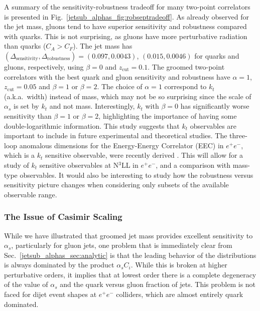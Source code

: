 \documentclass[11pt]{cernrep}
\begin{document}
A summary of the sensitivity-robustness tradeoff for many two-point correlators is presented in Fig.~\ref{jetsub_alphas_fig:robseptradeoff}.  As already observed for the jet mass, gluons tend to have superior sensitivity and robustness compared with quarks.
%
This is not surprising, as gluons have more perturbative radiation than quarks ($C_A>C_F$).
%
The jet mass has $(\Delta_\mathrm{sensitivity},\Delta_\mathrm{robustness})=(0.097,0.0043)$, $(0.015,0.0046)$ for quarks and gluons, respectively, using $\beta=0$ and $z_\mathrm{cut}=0.1$.
%
The groomed two-point correlators with the best quark and gluon sensitivity and robustness have $\alpha=1$, $z_\mathrm{cut}=0.05$ and $\beta=1$ or $\beta=2$.
%
The choice of $\alpha=1$ correspond to $k_t$ (a.k.a.~width) instead of mass, which may not be so surprising since the scale of $\alpha_s$ is set by $k_t$ and not mass.
%
Interestingly, $k_t$ with $\beta=0$ has significantly worse sensitivity than $\beta=1$ or $\beta=2$, highlighting the importance of having some double-logarithmic information. 
%
This study suggests that $k_t$ observables are important to include in future experimental and theoretical studies. The three-loop anomalous dimensions for the Energy-Energy Correlator (EEC) in $e^+e^-$, which is a $k_t$ sensitive observable, were recently derived \cite{Moult:2018jzp}. This will allow for a study of $k_t$ sensitive observables at N$^3$LL in $e^+e^-$, and a comparison with mass-type observables. 
%
It would also be interesting to study how the robustness versus sensitivity picture changes when considering only subsets of the available observable range.

\subsubsection{The Issue of Casimir Scaling}
\label{jetsub_alphas_sec:casimir}

While we have illustrated that groomed jet mass provides excellent sensitivity to $\alpha_s$, particularly for gluon jets, one problem that is immediately clear from Sec.~\ref{jetsub_alphas_sec:analytic} is that the leading behavior of the distributions is always dominated by the product $\alpha_s C_i$.
%
While this is broken at higher perturbative orders, it implies that at lowest order there is a complete degeneracy of the value of $\alpha_s$ and the quark versus gluon fraction of jets.
%
This problem is not faced for dijet event shapes at $e^+e^-$ colliders, which are almost entirely quark dominated.
\end{document}

